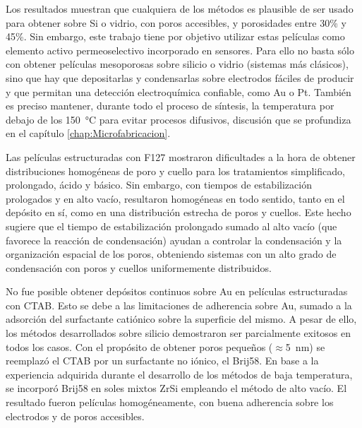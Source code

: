 	Los resultados muestran que cualquiera de los métodos es plausible de ser usado para obtener \pdm\space sobre Si o vidrio, con poros accesibles, y porosidades entre 30\% y 45\%. Sin embargo, este trabajo tiene por objetivo utilizar estas películas como elemento activo permeoselectivo incorporado en sensores. Para ello no basta sólo con obtener películas mesoporosas sobre silicio o vidrio (sistemas más clásicos), sino que hay que depositarlas y condensarlas sobre electrodos fáciles de producir y que permitan una detección electroquímica confiable, como Au o Pt. También es preciso mantener, durante todo el proceso de síntesis, la temperatura por debajo de los \SI{150}{\celsius} para evitar procesos difusivos, discusión que se profundiza en el capítulo \ref{chap:Microfabricacion}.

	Las películas estructuradas con F127 mostraron dificultades a la hora de obtener distribuciones homogéneas de poro y cuello para los tratamientos simplificado, prolongado, ácido y básico. Sin embargo, con tiempos de estabilización prologados y en alto vacío, resultaron homogéneas en todo sentido, tanto en el depósito en sí, como en una distribución estrecha de poros y cuellos. Este hecho sugiere que el tiempo de estabilización prolongado sumado al alto vacío (que favorece la reacción de condensación) ayudan a controlar la condensación y la organización espacial de los poros, obteniendo sistemas con un alto grado de condensación con poros y cuellos uniformemente distribuidos.

	No fue posible obtener depósitos continuos sobre Au en películas estructuradas con CTAB. Esto se debe a las limitaciones de adherencia sobre Au, sumado a la adsorción del surfactante catiónico sobre la superficie del mismo. A pesar de ello, los métodos desarrollados sobre silicio demostraron ser parcialmente exitosos en todos los casos. Con el propósito de obtener poros pequeños ($\approx$\SI{5}{\nm}) se reemplazó el CTAB por un surfactante no iónico, el Brij58. En base a la experiencia adquirida durante el desarrollo de los métodos de baja temperatura, se incorporó Brij58 en soles mixtos Zr\textbar Si empleando el método de alto vacío. El resultado fueron películas homogéneamente, con buena adherencia sobre los electrodos y de poros accesibles.

